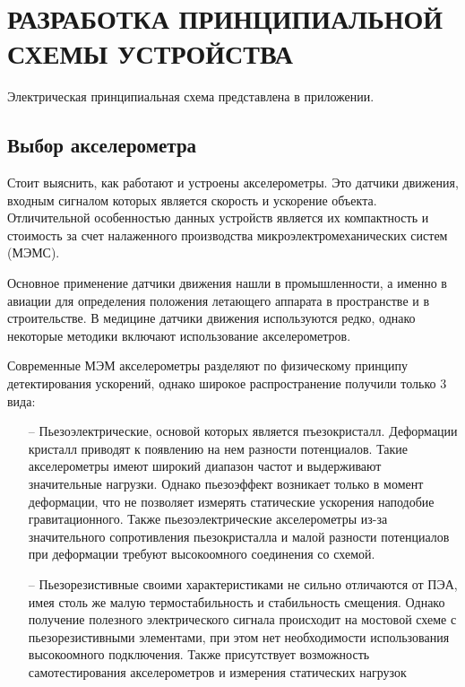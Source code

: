 \begin{sloppypar} %
\newpage %
\section{РАЗРАБОТКА ПРИНЦИПИАЛЬНОЙ СХЕМЫ УСТРОЙСТВА} %
Электрическая принципиальная схема представлена в приложении.

\subsection{Выбор акселерометра}
Стоит выяснить, как работают и устроены акселерометры. \cite{MEMS} Это датчики движения, входным сигналом которых является скорость и ускорение объекта. Отличительной особенностью данных устройств является их компактность и стоимость за счет налаженного производства микроэлектромеханических систем (МЭМС).

Основное применение датчики движения нашли в промышленности, а именно в авиации для определения положения летающего аппарата в пространстве и в строительстве. В медицине датчики движения используются редко, однако некоторые методики включают использование акселерометров.

Современные МЭМ акселерометры разделяют по физическому принципу детектирования ускорений, однако широкое распространение получили только 3 вида:

\begin{itemize}

	\item[--]Пьезоэлектрические, основой которых является пъезокристалл. Деформации кристалл приводят к появлению на нем разности потенциалов. Такие акселерометры имеют широкий диапазон частот и выдерживают значительные нагрузки. Однако пьезоэффект возникает только в момент деформации, что не позволяет измерять статические ускорения наподобие гравитационного. Также пьезоэлектрические акселерометры из-за значительного сопротивления пьезокристалла и малой разности потенциалов при деформации требуют высокоомного соединения со схемой. 

	\item[--]Пьезорезистивные своими характеристиками не сильно отличаются от ПЭА, имея столь же малую термостабильность и стабильность смещения. Однако получение полезного электрического сигнала происходит на мостовой схеме с пьезорезистивными элементами, при этом нет необходимости использования высокоомного подключения. Также присутствует возможность самотестирования акселерометров и измерения статических нагрузок 


\end{itemize}
\end{sloppypar}
